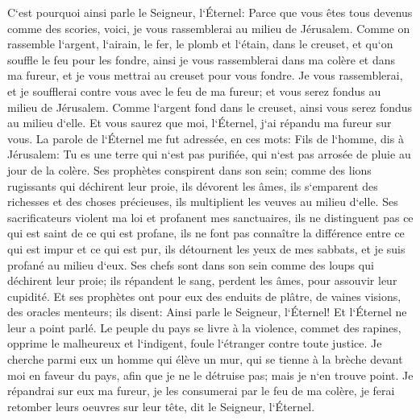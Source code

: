 \verse C`est pourquoi ainsi parle le Seigneur, l`Éternel: Parce que vous êtes tous devenus comme des scories, voici, je vous rassemblerai au milieu de Jérusalem. 
\verse Comme on rassemble l`argent, l`airain, le fer, le plomb et l`étain, dans le creuset, et qu`on souffle le feu pour les fondre, ainsi je vous rassemblerai dans ma colère et dans ma fureur, et je vous mettrai au creuset pour vous fondre. 
\verse Je vous rassemblerai, et je soufflerai contre vous avec le feu de ma fureur; et vous serez fondus au milieu de Jérusalem. 
\verse Comme l`argent fond dans le creuset, ainsi vous serez fondus au milieu d`elle. Et vous saurez que moi, l`Éternel, j`ai répandu ma fureur sur vous. 
\verse La parole de l`Éternel me fut adressée, en ces mots: 
\verse Fils de l`homme, dis à Jérusalem: Tu es une terre qui n`est pas purifiée, qui n`est pas arrosée de pluie au jour de la colère. 
\verse Ses prophètes conspirent dans son sein; comme des lions rugissants qui déchirent leur proie, ils dévorent les âmes, ils s`emparent des richesses et des choses précieuses, ils multiplient les veuves au milieu d`elle. 
\verse Ses sacrificateurs violent ma loi et profanent mes sanctuaires, ils ne distinguent pas ce qui est saint de ce qui est profane, ils ne font pas connaître la différence entre ce qui est impur et ce qui est pur, ils détournent les yeux de mes sabbats, et je suis profané au milieu d`eux. 
\verse Ses chefs sont dans son sein comme des loups qui déchirent leur proie; ils répandent le sang, perdent les âmes, pour assouvir leur cupidité. 
\verse Et ses prophètes ont pour eux des enduits de plâtre, de vaines visions, des oracles menteurs; ils disent: Ainsi parle le Seigneur, l`Éternel! Et l`Éternel ne leur a point parlé. 
\verse Le peuple du pays se livre à la violence, commet des rapines, opprime le malheureux et l`indigent, foule l`étranger contre toute justice. 
\verse Je cherche parmi eux un homme qui élève un mur, qui se tienne à la brèche devant moi en faveur du pays, afin que je ne le détruise pas; mais je n`en trouve point. 
\verse Je répandrai sur eux ma fureur, je les consumerai par le feu de ma colère, je ferai retomber leurs oeuvres sur leur tête, dit le Seigneur, l`Éternel. 


